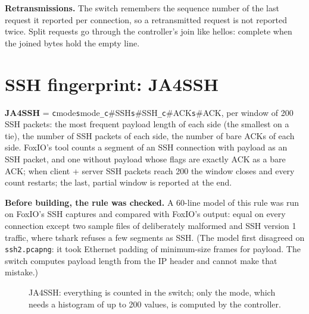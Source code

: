 \documentclass[11pt,a4paper]{article}
\newcommand{\code}[1]{\texttt{#1}}
\begin{document}
\textbf{Retransmissions.} The switch remembers the sequence number of the last request it reported per connection,
so a retransmitted request is not reported twice. Split requests go through the controller's join like hellos:
complete when the joined bytes hold the empty line.

\section{SSH fingerprint: JA4SSH}

\textbf{JA4SSH} = \code{c}mode\code{s}mode\code{\_c}\#SSH\code{s}\#SSH\code{\_c}\#ACK\code{s}\#ACK, per window of 200
SSH packets: the most frequent payload length of each side (the smallest on a tie), the number of SSH packets of
each side, the number of bare ACKs of each side. FoxIO's tool counts a segment of an SSH connection with payload as
an SSH packet, and one without payload whose flags are exactly ACK as a bare ACK; when client + server SSH packets reach
200 the window closes and every count restarts; the last, partial window is reported at the end.

\textbf{Before building, the rule was checked.} A 60-line model of this rule was run on FoxIO's SSH captures and
compared with FoxIO's output: equal on every connection except two sample files of deliberately malformed and SSH
version 1 traffic, where tshark refuses a few segments as SSH. (The model first disagreed on \code{ssh2.pcapng}:
it took Ethernet padding of minimum-size frames for payload. The switch computes payload length from the IP header and
cannot make that mistake.)

\begin{figure}[H]\centering
{}
\caption{JA4SSH: everything is counted in the switch; only the mode, which needs a histogram of up to 200 values, is
computed by the controller.}
\end{figure}
\end{document}
